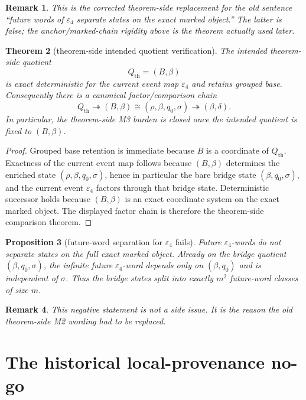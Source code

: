 \documentclass[11pt]{article}
\newtheorem{theorem}{Theorem}[section]
\newtheorem{proposition}[theorem]{Proposition}
\newtheorem{remark}[theorem]{Remark}
\newcommand{\eps}{\varepsilon}
\begin{document}
\begin{remark}
This is the corrected theorem-side replacement for the old sentence ``future
words of $\eps_4$ separate states on the exact marked object.'' The latter is
false; the anchor/marked-chain rigidity above is the theorem actually used
later.
\end{remark}

\begin{theorem}[theorem-side intended quotient verification]
\label{thm:Qth-verification}
The intended theorem-side quotient
\[
Q_{\mathrm{th}}=(B,\beta)
\]
is exact deterministic for the current event map $\eps_4$ and retains grouped
base. Consequently there is a canonical factor/comparison chain
\[
Q_{\mathrm{th}}
\twoheadrightarrow
(B,\beta)
\cong
(\rho,\beta,q_0,\sigma)
\twoheadrightarrow
(\beta,\delta).
\]
In particular, the theorem-side M3 burden is closed once the intended quotient
is fixed to $(B,\beta)$.
\end{theorem}

\begin{proof}
Grouped base retention is immediate because $B$ is a coordinate of
$Q_{\mathrm{th}}$.
Exactness of the current event map follows because $(B,\beta)$ determines the
enriched state $(\rho,\beta,q_0,\sigma)$, hence in particular the bare bridge
state $(\beta,q_0,\sigma)$, and the current event $\eps_4$ factors through that
bridge state.
Deterministic successor holds because $(B,\beta)$ is an exact coordinate system
on the exact marked object.
The displayed factor chain is therefore the theorem-side comparison theorem.
\end{proof}

\begin{proposition}[future-word separation for $\eps_4$ fails]
\label{prop:future-word-fails}
Future $\eps_4$-words do not separate states on the full exact marked object.
Already on the bridge quotient $(\beta,q_0,\sigma)$, the infinite future
$\eps_4$-word depends only on $(\beta,q_0)$ and is independent of $\sigma$.
Thus the bridge states split into exactly $m^2$ future-word classes of size
$m$.
\end{proposition}

\begin{remark}
This negative statement is not a side issue. It is the reason the old theorem-side
M2 wording had to be replaced.
\end{remark}

\section{The historical local-provenance no-go}
\end{document}
